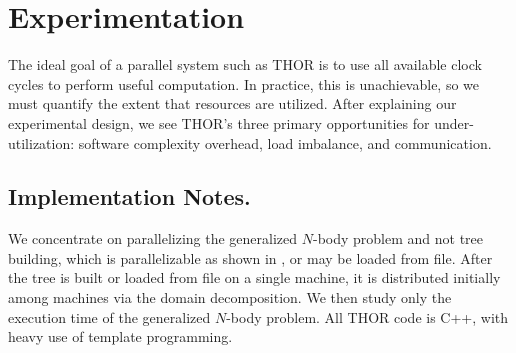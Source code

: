 \documentclass[twoside,leqno,twocolumn]{article}
\newcommand{\authornote}[1]{(\footnote{Note to self: #1})}
\newcommand{\authorsnote}[1]{\authornote{#1}}
\newcommand{\mysub}[1]{\subsection{#1.}}
\begin{document}





\section{Experimentation}


The ideal goal of a parallel system such as THOR is to use all available clock cycles to perform useful computation.
In practice, this is unachievable, so we must quantify the extent that resources are utilized.
After explaining our experimental design, we see THOR's three primary opportunities for under-utilization: software complexity overhead, load imbalance, and communication.

\mysub{Implementation Notes}

We concentrate on parallelizing the generalized $N$-body problem and not tree building, which is parallelizable as shown in \cite{alfuraih00parallel}, or may be loaded from file.
After the tree is built or loaded from file on a single machine, it is distributed initially among machines via the domain decomposition.
We then study only the execution time of the generalized $N$-body problem.
All THOR code is C++, with heavy use of template programming.
\end{document}
